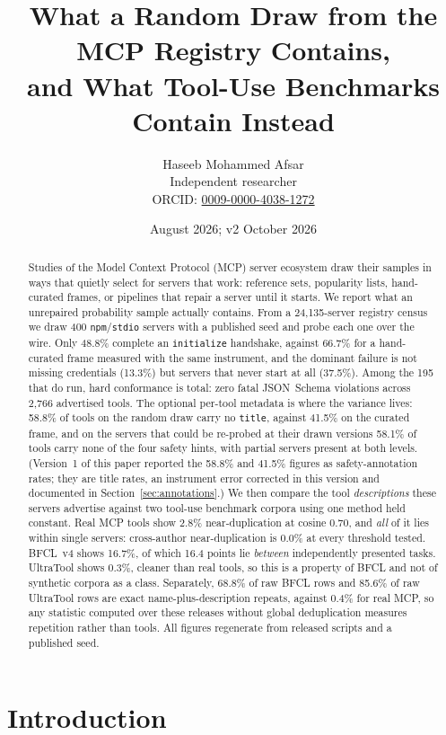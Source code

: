 \documentclass[11pt]{article}
\title{What a Random Draw from the MCP Registry Contains,\\
and What Tool-Use Benchmarks Contain Instead}
\author{Haseeb Mohammed Afsar\\
  \small Independent researcher\\
  \small ORCID: \href{https://orcid.org/0009-0000-4038-1272}{0009-0000-4038-1272}}
\date{August 2026; v2 October 2026}
\begin{document}
\maketitle

\begin{abstract}
Studies of the Model Context Protocol (MCP) server ecosystem draw their samples in
ways that quietly select for servers that work: reference sets, popularity lists,
hand-curated frames, or pipelines that repair a server until it starts. We report
what an unrepaired probability sample actually contains. From a 24{,}135-server
registry census we draw 400 \texttt{npm}/\texttt{stdio} servers with a published
seed and probe each one over the wire. Only 48.8\% complete an
\texttt{initialize} handshake, against 66.7\% for a hand-curated frame measured
with the same instrument, and the dominant failure is not missing credentials
(13.3\%) but servers that never start at all (37.5\%). Among the 195 that do run,
hard conformance is total: zero fatal JSON~Schema violations across 2{,}766
advertised tools. The optional per-tool metadata is where the variance lives:
58.8\% of tools on the random draw carry no \texttt{title}, against 41.5\% on the
curated frame, and on the servers that could be re-probed at their drawn versions
58.1\% of tools carry none of the four safety hints, with partial servers present
at both levels. (Version~1 of this paper reported the 58.8\% and 41.5\% figures as
safety-annotation rates; they are title rates, an instrument error corrected in
this version and documented in Section~\ref{sec:annotations}.) We then compare the tool
\emph{descriptions} these servers advertise against two tool-use benchmark
corpora using one method held constant. Real MCP tools show 2.8\% near-duplication
at cosine 0.70, and \emph{all} of it lies within single servers: cross-author
near-duplication is 0.0\% at every threshold tested. BFCL~v4 shows 16.7\%, of
which 16.4 points lie \emph{between} independently presented tasks. UltraTool
shows 0.3\%, cleaner than real tools, so this is a property of BFCL and not of
synthetic corpora as a class. Separately, 68.8\% of raw BFCL rows and 85.6\% of
raw UltraTool rows are exact name-plus-description repeats, against 0.4\% for
real MCP, so any statistic computed over these releases without global
deduplication measures repetition rather than tools. All figures regenerate from
released scripts and a published seed.
\end{abstract}

\section{Introduction}
\end{document}
